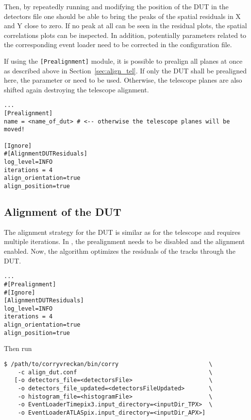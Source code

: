 Then, by repeatedly running \corry and modifying the position of the DUT in the detectors file one should be able to bring the peaks of the spatial residuals in X and Y close to zero.
If no peak at all can be seen in the residual plots, the spatial correlations plots can be inspected. In addition, potentially parameters related to the corresponding event loader need to be corrected in the configuration file.

\begin{warning}
If using the \texttt{[Prealignment]} module, it is possible to prealign all planes at once as described above in Section~\ref{sec:align_tel}.
If only the DUT shall be prealigned here, the parameter  or  need to be used.
Otherwise, the telescope planes are also shifted again destroying the telescope alignment.
\end{warning}

\begin{verbatim}
...
[Prealignment]
name = <name_of_dut> # <-- otherwise the telescope planes will be moved!

[Ignore]
#[AlignmentDUTResiduals]
log_level=INFO
iterations = 4
align_orientation=true
align_position=true
\end{verbatim}

\subsection*{Alignment of the DUT}
The alignment strategy for the DUT is similar as for the telescope and requires multiple iterations.
In , the prealignment needs to be disabled and the alignment enabled.
Now, the algorithm optimizes the residuals of the tracks through the DUT.

\begin{verbatim}
...
#[Prealignment]
#[Ignore]
[AlignmentDUTResiduals]
log_level=INFO
iterations = 4
align_orientation=true
align_position=true
\end{verbatim}

Then run
\begin{verbatim}
$ /path/to/corryvreckan/bin/corry                          \
    -c align_dut.conf                                      \
   [-o detectors_file=<detectorsFile>                      \
    -o detectors_file_updated=<detectorsFileUpdated>       \
    -o histogram_file=<histogramFile>                      \
    -o EventLoaderTimepix3.input_directory=<inputDir_TPX>  \
    -o EventLoaderATLASpix.input_directory=<inputDir_APX>]
\end{verbatim}

